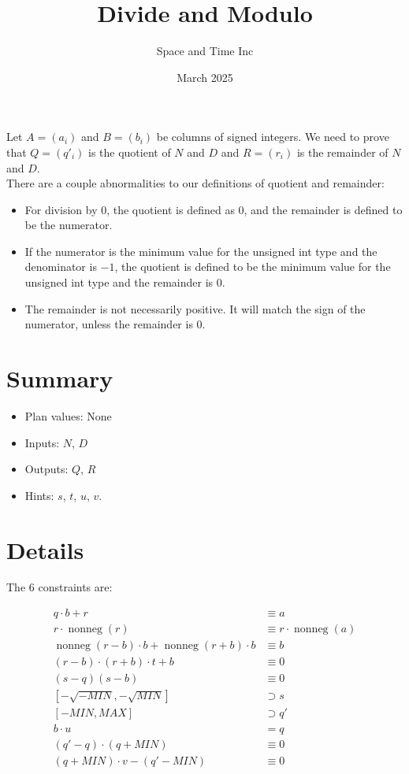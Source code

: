\documentclass[11pt]{article}
\title{Divide and Modulo}
\author{Space and Time Inc}
\date{March 2025}
\DeclareMathOperator{\nonneg}{nonneg}
\begin{document}
\maketitle

\noindent Let $A=(a_{i})$ and $B=(b_{i})$ be columns of signed integers. We need to prove that $Q=(q'_{i})$ is the quotient of $N$ and $D$ and $R=(r_{i})$ is the remainder of $N$ and $D$. \\
There are a couple abnormalities to our definitions of quotient and remainder:
\begin{itemize}
    \item For division by 0, the quotient is defined as 0, and the remainder is defined to be the numerator.
    \item If the numerator is the minimum value for the unsigned int type and the denominator is $-1$, the quotient is defined to be the minimum value for the unsigned int type and the remainder is $0$.
    \item The remainder is not necessarily positive. It will match the sign of the numerator, unless the remainder is $0$.
\end{itemize}

\section{Summary}
\begin{itemize}
    \item Plan values: None
    \item Inputs: $N$, $D$
    \item Outputs: $Q$, $R$
    \item Hints: $s$, $t$, $u$, $v$.
\end{itemize}

\section{Details}

The $6$ constraints are:

\begin{align*}
    q\cdot b + r &\equiv a\tag{1}\\
    r\cdot \nonneg(r)&\equiv r\cdot \nonneg(a)\tag{2}\\
    \nonneg(r-b)\cdot b + \nonneg(r+b)\cdot b &\equiv b \tag{3.1}\\
    (r-b)\cdot (r+b)\cdot t + b&\equiv 0\tag{3.2}\\
    (s-q)(s-b)&\equiv 0\tag{4.1}\\
    [-\sqrt{-MIN},-\sqrt{MIN}]&\supset s\tag{4.2}\\
    [-MIN,MAX]&\supset q'\tag{4.3}\\
    b \cdot u &= q\\
    (q'-q)\cdot (q+MIN)&\equiv 0\tag{6.1}\\
    (q+MIN)\cdot v-(q'-MIN)&\equiv 0\tag{6.2}\\
\end{align*}
\end{document}
